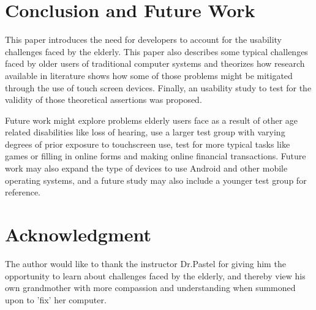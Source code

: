 \documentclass[12pt,draftcls,onecolumn]{IEEEtran}
\begin{document}
\section{Conclusion and Future Work}
This paper introduces the need for developers to account for the usability challenges faced by the elderly. This paper also describes some typical challenges faced by older users of traditional computer systems and theorizes how research available in literature shows how some of those problems might be mitigated through the use of touch screen devices. Finally, an usability study to test for the validity of those theoretical assertions was proposed.

Future work might explore problems elderly users face as a result of other age related disabilities like loss of hearing, use a larger test group with varying degrees of prior exposure to touchscreen use, test for more typical tasks like games or filling in online forms and making online financial transactions. Future work may also expand the type of devices to use Android and other mobile operating systems, and a future study may also include a younger test group for reference.






\section*{Acknowledgment}


The author would like to thank the instructor Dr.Pastel for giving him the opportunity to learn about challenges faced by the elderly, and thereby view his own grandmother with more compassion and understanding when summoned upon to 'fix' her computer.









%







\end{document}
